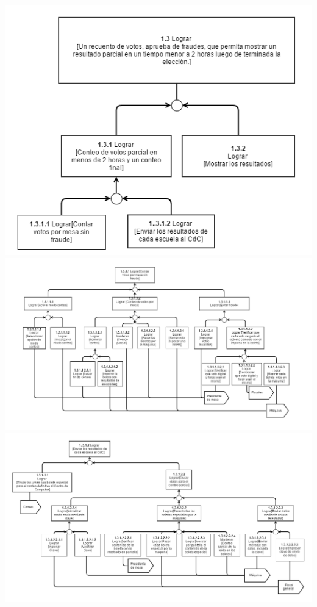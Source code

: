 \includegraphics[scale=0.55]{imagenes/Diagramas/13/13.png}
\\
\includegraphics[scale=0.55]{imagenes/Diagramas/13/1311.png}
\\
\includegraphics[scale=0.55]{imagenes/Diagramas/13/1312.png}
